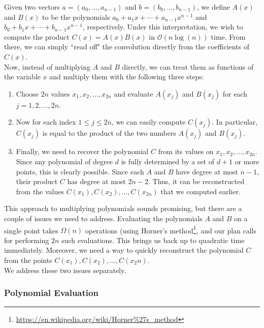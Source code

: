 Given two vectors $a = (a_0, \ldots, a_{n - 1})$ and $b = (b_0, \ldots, b_{n - 1})$, we define $A(x)$ and $B(x)$ to be the polynomials $a_0 + a_1x + \cdots + a_{n-1}x^{n-1}$ and $b_0 + b_1x + \cdots + b_{n-1}x^{n-1}$, respectively. Under this interpretation, we wish to compute the product $C(x) = A(x)B(x)$ in $\mathcal{O}(n\log(n))$ time. From there, we can simply ``read off" the convolution directly from the coefficients of $C(x)$. \\

Now, instead of multiplying $A$ and $B$ directly, we can treat them as functions of the variable $x$ and multiply them with the following three steps:

\begin{enumerate}
    \item Choose $2n$ values $x_1, x_2, \ldots, x_{2n}$ and evaluate $A(x_j)$ and $B(x_j)$ for each $j = 1, 2, \ldots, 2n$.
    \item Now for each index $1 \leq j \leq 2n$, we can easily compute $C(x_j)$. In particular, $C(x_j)$ is equal to the product of the two numbers $A(x_j)$ and $B(x_j)$.
    \item Finally, we need to recover the polynomial $C$ from its values on $x_1, x_2, \ldots, x_{2n}$. Since any polynomial of degree $d$ is fully determined by a set of $d + 1$ or more points, this is clearly possible. Since each $A$ and $B$ have degree at most $n - 1$, their product $C$ has degree at most $2n - 2$. Thus, it can be reconstructed from the values $C(x_1), C(x_2), \ldots, C(x_{2n})$ that we computed earlier.
\end{enumerate}

This approach to multiplying polynomials sounds promising, but there are a couple of issues we need to address. Evaluating the polynomials $A$ and $B$ on a single point takes $\Omega(n)$ operations (using Horner's method\footnote{\url{https://en.wikipedia.org/wiki/Horner\%27s_method}}, and our plan calls for performing $2n$ such evaluations. This brings us back up to quadratic time immediately. Moreover, we need a way to quickly reconstruct the polynomial $C$ from the points $C(x_1), C(x_2), \ldots, C(x_2n)$. \\

We address these two issues separately.

\subsubsection{Polynomial Evaluation}

